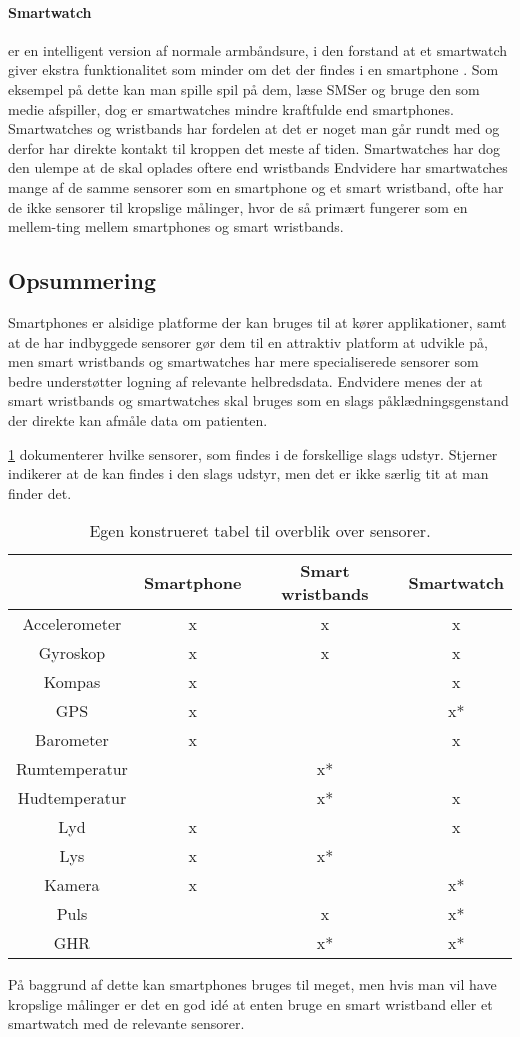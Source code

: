 \paragraph{Smartwatch}
 er en intelligent version af normale armbåndsure, i den forstand at et smartwatch giver ekstra funktionalitet som minder om det der findes i en smartphone \citep{msic:smartwatchstate}. 
Som eksempel på dette kan man spille spil på dem, læse SMSer og bruge den som medie afspiller, dog er smartwatches mindre kraftfulde end smartphones. 
Smartwatches og wristbands har fordelen at det er noget man går rundt med og derfor har direkte kontakt til kroppen det meste af tiden. Smartwatches har dog den ulempe at de skal oplades oftere end wristbands
Endvidere har smartwatches mange af de samme sensorer som en smartphone og et smart wristband, ofte har de ikke sensorer til kropslige målinger, hvor de så primært fungerer som en mellem-ting mellem smartphones og smart wristbands.

\subsection{Opsummering}
Smartphones er alsidige platforme der kan bruges til at kører applikationer, samt at de har indbyggede sensorer gør dem til en attraktiv platform at udvikle på, men smart wristbands og smartwatches har mere specialiserede sensorer som bedre understøtter logning af relevante helbredsdata.
Endvidere menes der at smart wristbands og smartwatches skal bruges som en slags påklædningsgenstand der direkte kan afmåle data om patienten.

\cref{tab:sensorsInDevices} dokumenterer hvilke sensorer, som findes i de forskellige slags udstyr. Stjerner indikerer at de kan findes i den slags udstyr, men det er ikke særlig tit at man finder det. %

\begin{table}
\centering
\begin{tabular}{|c|c|c|c|}
\hline  			 & Smartphone 	& Smart wristbands 	& Smartwatch 	\\ 
\hline Accelerometer &  x		  	&  			x	 	&  		x  		\\ 
\hline Gyroskop		 &	x			&			x		&		x		\\
\hline Kompas		 &  x			&					&		x		\\
\hline GPS			 &	x			&					&		x*		\\
\hline Barometer	 &	x			&					&		x		\\
\hline Rumtemperatur &				&			x*		&				\\
\hline Hudtemperatur &				&			x*		&		x		\\
\hline Lyd			 &	x			&					&		x		\\
\hline Lys			 &	x			&			x*		&				\\
\hline Kamera		 &	x			&					&		x*		\\
\hline Puls			 &				&			x		&		x*		\\
\hline GHR			 &				&			x*		&		x*		\\ \hline
\end{tabular}
\caption{Egen konstrueret tabel til overblik over sensorer.}\label{tab:sensorsInDevices}
\end{table}

På baggrund af dette kan smartphones bruges til meget, men hvis man vil have kropslige målinger er det en god idé at enten bruge en smart wristband eller et smartwatch med de relevante sensorer.